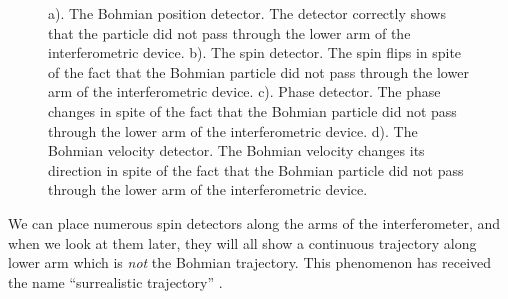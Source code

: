 \documentclass[preprint,tightenlines]{elsarticle}
\begin{document}
\begin{figure}[H]
{     a). The Bohmian position detector.  The detector correctly shows that the particle did not pass through the lower arm of the interferometric device.
      b). The spin detector.  The spin flips in spite of the fact that the Bohmian particle did not pass through the lower arm of the interferometric device.
       c). Phase  detector.  The phase changes in spite of the fact that the Bohmian particle did not pass through the lower arm of the interferometric device.
        d). The Bohmian velocity  detector.  The Bohmian velocity changes its direction in spite of the fact that the Bohmian particle did not pass through the lower arm of the interferometric device.
     }
\end{figure}


We can place numerous spin detectors along the arms of the interferometer, and
when we look at them later, they will all show a continuous trajectory
along lower arm which is \textit{not} the Bohmian trajectory. This
phenomenon has received the name ``surrealistic trajectory'' \cite{englert1992surrealistic}.
\end{document}
